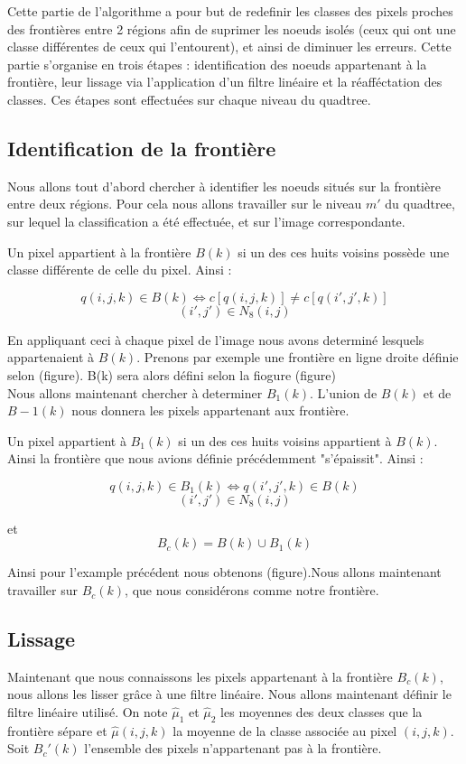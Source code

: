 Cette partie de l'algorithme a pour but de redefinir les classes des pixels proches des frontières entre 2 régions afin de suprimer les noeuds isolés (ceux qui ont une classe différentes de ceux qui l'entourent), et ainsi de diminuer les erreurs. Cette partie s'organise en trois étapes : identification des noeuds appartenant à la frontière, leur lissage via l'application d'un filtre linéaire et la réafféctation des classes. Ces étapes sont effectuées sur chaque niveau du quadtree.

\subsection{Identification de la frontière}
	Nous allons tout d'abord chercher à identifier les noeuds situés sur la frontière entre deux régions. Pour cela nous allons travailler sur le niveau $m'$ du quadtree, sur lequel la classification a été effectuée, et sur l'image correspondante. 

	Un pixel appartient à la frontière $B(k)$ si un des ces huits voisins possède une classe différente de celle du pixel. Ainsi :

	\[ q(i,j,k) \in B(k) \Leftrightarrow c[q(i,j,k)] \ne c[q(i',j',k)] \]
	\[ (i',j') \in N_8(i,j) \]

	En appliquant ceci à chaque pixel de l'image nous avons determiné lesquels appartenaient à $B(k)$. Prenons par exemple une frontière en ligne droite définie selon (figure). B(k) sera alors défini selon la fiogure (figure)\\

	Nous allons maintenant chercher à determiner $B_1(k)$. L'union de $B(k)$ et de $B-1(k)$ nous donnera les pixels appartenant aux frontière.

	Un pixel appartient à $B_1(k)$ si un des ces huits voisins appartient à $B(k)$. Ainsi la frontière que nous avions définie précédemment "s'épaissit". Ainsi :

	\[ q(i,j,k) \in B_1(k) \Leftrightarrow q(i',j',k) \in B(k) \]
	\[ (i',j') \in N_8(i,j) \]

	et \[ B_c(k) = B(k) \cup B_1(k) \]

	Ainsi pour l'example précédent nous obtenons (figure).Nous allons maintenant travailler sur $B_c(k)$, que nous considérons comme notre frontière. 

\subsection{Lissage}
	Maintenant que nous connaissons les pixels appartenant à la frontière $B_c(k)$, nous allons les lisser grâce à une filtre linéaire. Nous allons maintenant définir le filtre linéaire utilisé.
	On note $\hat{\mu}_1$ et $\hat{\mu}_2$ les moyennes des deux classes que la frontière sépare et $\hat{\mu}(i,j,k)$ la moyenne de la classe associée au pixel $(i,j,k)$. 
	Soit $B_c'(k)$ l'ensemble des pixels n'appartenant pas à la frontière.

